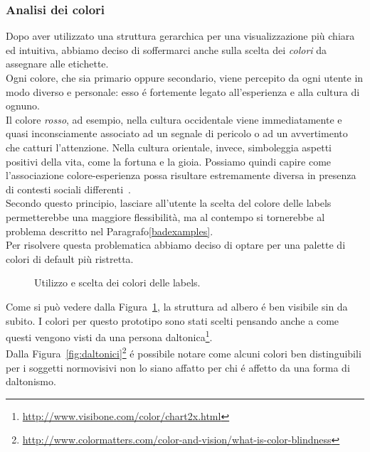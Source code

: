 \documentclass[12pt]{article} %
\begin{document}
\subsubsection{Analisi dei colori}
Dopo aver utilizzato una struttura gerarchica per una visualizzazione pi\`u chiara ed intuitiva, abbiamo deciso di soffermarci anche sulla scelta dei \emph{colori} da assegnare alle etichette.\\
Ogni colore, che sia primario oppure secondario, viene percepito da ogni utente in modo diverso e personale: esso \'e fortemente legato all'esperienza e alla cultura di ognuno.\\
Il colore \emph{rosso}, ad esempio, nella cultura occidentale viene immediatamente e quasi inconsciamente associato ad un segnale di pericolo o ad un avvertimento che catturi l'attenzione. Nella cultura orientale, invece, simboleggia aspetti positivi della vita, come la fortuna e la gioia. Possiamo quindi capire come l'associazione colore-esperienza possa risultare estremamente diversa in presenza di contesti sociali differenti~\cite[p.~9-12]{thesis}.\\
Secondo questo principio, lasciare all'utente la scelta del colore delle labels permetterebbe una maggiore flessibilit\`a, ma al contempo si tornerebbe al problema descritto nel Paragrafo\ref{badexamples}.\\
Per risolvere questa problematica abbiamo deciso di optare per una palette di colori di default pi\`u ristretta.

\begin{figure}[H]
\caption{Utilizzo e scelta dei colori delle labels.}
\label{fig:finale}
\end{figure}

Come si pu\`o vedere dalla Figura~\ref{fig:finale}, la struttura ad albero \'e ben visibile sin da subito. I colori per questo prototipo sono stati scelti pensando anche a come questi vengono visti da una persona daltonica\footnote{\url{http://www.visibone.com/color/chart2x.html}}.\\
Dalla Figura~\ref{fig:daltonici}\footnote{\url{http://www.colormatters.com/color-and-vision/what-is-color-blindness}} \'e possibile notare come alcuni colori ben distinguibili per i soggetti normovisivi non lo siano affatto per chi \'e affetto da una forma di daltonismo.
\end{document}
